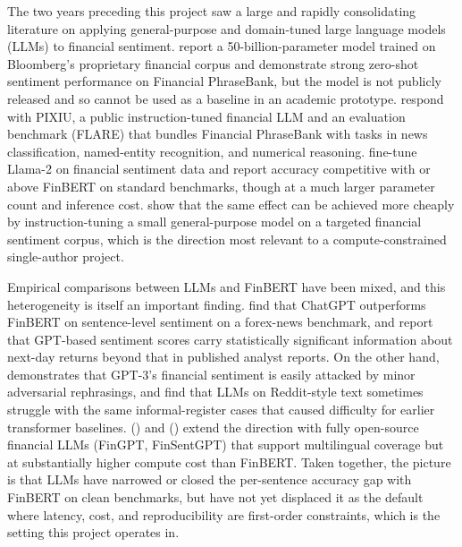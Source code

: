 The two years preceding this project saw a large and rapidly consolidating literature on applying general-purpose and domain-tuned large language models (LLMs) to financial sentiment. \citet{wu2023bloomberggpt} report a 50-billion-parameter model trained on Bloomberg's proprietary financial corpus and demonstrate strong zero-shot sentiment performance on Financial PhraseBank, but the model is not publicly released and so cannot be used as a baseline in an academic prototype. \citet{xie2023pixiu} respond with PIXIU, a public instruction-tuned financial LLM and an evaluation benchmark (FLARE) that bundles Financial PhraseBank with tasks in news classification, named-entity recognition, and numerical reasoning. \citet{konstantinidis2024finllama} fine-tune Llama-2 on financial sentiment data and report accuracy competitive with or above FinBERT on standard benchmarks, though at a much larger parameter count and inference cost. \citet{zhang2023instructfingpt} show that the same effect can be achieved more cheaply by instruction-tuning a small general-purpose model on a targeted financial sentiment corpus, which is the direction most relevant to a compute-constrained single-author project.

Empirical comparisons between LLMs and FinBERT have been mixed, and this heterogeneity is itself an important finding. \citet{fatouros2023transforming} find that ChatGPT outperforms FinBERT on sentence-level sentiment on a forex-news benchmark, and \citet{lopez2023chatgpt} report that GPT-based sentiment scores carry statistically significant information about next-day returns beyond that in published analyst reports. On the other hand, \citet{leippold2023sentiment} demonstrates that GPT-3's financial sentiment is easily attacked by minor adversarial rephrasings, and \citet{deng2023llm} find that LLMs on Reddit-style text sometimes struggle with the same informal-register cases that caused difficulty for earlier transformer baselines. \citeauthor{weng2023fingpt} (\citeyear{weng2023fingpt}) and \citeauthor{mahda2024finsentgpt} (\citeyear{mahda2024finsentgpt}) extend the direction with fully open-source financial LLMs (FinGPT, FinSentGPT) that support multilingual coverage but at substantially higher compute cost than FinBERT. Taken together, the picture is that LLMs have narrowed or closed the per-sentence accuracy gap with FinBERT on clean benchmarks, but have not yet displaced it as the default where latency, cost, and reproducibility are first-order constraints, which is the setting this project operates in.

